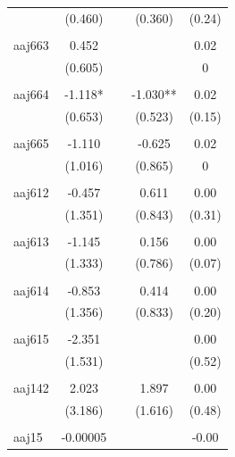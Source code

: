\documentclass[12pt, a4paper]{article}
\begin{document}
{\begin{longtable}{@{\extracolsep{5pt}}lcccc}
				& (0.460)    &            & (0.360)   & (0.24)  \\
				&            &            &           &         \\
				aaj663     & 0.452      &            &           & 0.02    \\
				& (0.605)    &            &           & 0       \\
				&            &            &           &         \\
				aaj664     & -1.118*    &            & -1.030**  & 0.02    \\
				& (0.653)    &            & (0.523)   & (0.15)  \\
				&            &            &           &         \\
				aaj665     & -1.110     &            & -0.625    & 0.02    \\
				& (1.016)    &            & (0.865)   & 0       \\
				&            &            &           &         \\
				aaj612     & -0.457     &            & 0.611     & 0.00    \\
				& (1.351)    &            & (0.843)   & (0.31)  \\
				&            &            &           &         \\
				aaj613     & -1.145     &            & 0.156     & 0.00    \\
				& (1.333)    &            & (0.786)   & (0.07)  \\
				&            &            &           &         \\
				aaj614     & -0.853     &            & 0.414     & 0.00    \\
				& (1.356)    &            & (0.833)   & (0.20)  \\
				&            &            &           &         \\
				aaj615     & -2.351     &            &           & 0.00    \\
				& (1.531)    &            &           & (0.52)  \\
				&            &            &           &         \\
				aaj142     & 2.023      &            & 1.897     & 0.00    \\
				& (3.186)    &            & (1.616)   & (0.48)  \\
				&            &            &           &         \\
				aaj15      & -0.00005   &            &           & -0.00   \\

\end{longtable}}
\end{document}
